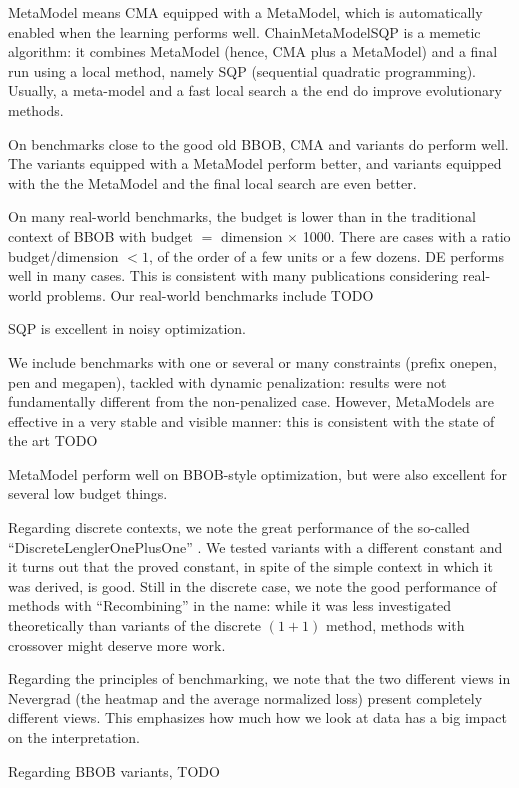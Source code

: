 MetaModel means CMA equipped with a MetaModel, which is automatically enabled when the learning performs well.
ChainMetaModelSQP is a memetic algorithm: it combines MetaModel (hence, CMA plus a MetaModel) and a final run using a local method, namely SQP (sequential quadratic programming).
Usually, a meta-model and a fast local search a the end do improve evolutionary methods.

On benchmarks close to the good old BBOB, CMA and variants do perform well. The variants equipped with a MetaModel perform better, and
variants equipped with the the MetaModel and the final local search are even better.

On many real-world benchmarks, the budget is lower than in the traditional context of BBOB with budget $=$ dimension $\times$ 1000. There
are cases with a ratio budget/dimension $<1$, of the order of a few units or a few dozens. DE performs well in many cases. This is consistent with many publications considering real-world problems. Our real-world benchmarks include TODO

SQP is excellent in noisy optimization. 

We include benchmarks with one or several or many constraints (prefix onepen, pen and megapen), tackled with dynamic penalization: results were not fundamentally different from the non-penalized case. However, MetaModels are effective in a very stable and visible manner: this is consistent with the state of the art TODO

MetaModel perform well on BBOB-style optimization, but were also excellent for several low budget things.

Regarding discrete contexts, we note the great performance of the so-called ``DiscreteLenglerOnePlusOne'' \cite{lengler}. We tested variants with a different constant and it turns out that the proved constant, in spite of the simple context in which it was derived, is good.
Still in the discrete case, we note the good performance of methods with ``Recombining'' in the name: while it was less investigated theoretically than variants of the discrete $(1+1)$ method, methods with crossover might deserve more work.

Regarding the principles of benchmarking, we note that the two different views in Nevergrad (the heatmap and the average normalized loss) present completely different views. This emphasizes how much how we look at data has a big impact on the interpretation.

Regarding BBOB variants, TODO

